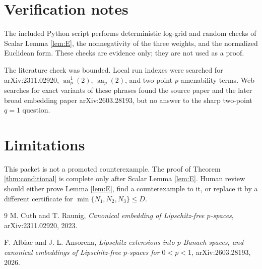 \documentclass[11pt]{article}
\newcommand{\absamen}{\operatorname{aa}}
\begin{document}
\section{Verification notes}

The included Python script performs deterministic log-grid and random checks of
Scalar Lemma \ref{lem:E}, the nonnegativity of the three weights, and the
normalized Euclidean form.  These checks are evidence only; they are not used
as a proof.

The literature check was bounded.  Local run indexes were searched for
arXiv:2311.02920, \(\absamen_p^1(2)\), \(\absamen_p(2)\), and two-point
\(p\)-amenability terms.  Web searches for exact variants of these phrases
found the source paper and the later broad embedding paper arXiv:2603.28193,
but no answer to the sharp two-point \(q=1\) question.

\section{Limitations}

This packet is not a promoted counterexample.  The proof of Theorem
\ref{thm:conditional} is complete only after Scalar Lemma \ref{lem:E}.  Human
review should either prove Lemma \ref{lem:E}, find a counterexample to it, or
replace it by a different certificate for
\(\min\{N_1,N_2,N_3\}\le D\).

\begin{thebibliography}{9}
M. Cuth and T. Raunig,
\emph{Canonical embedding of Lipschitz-free \(p\)-spaces},
arXiv:2311.02920, 2023.

F. Albiac and J. L. Ansorena,
\emph{Lipschitz extensions into \(p\)-Banach spaces, and canonical embeddings
of Lipschitz-free \(p\)-spaces for \(0<p<1\)},
arXiv:2603.28193, 2026.
\end{thebibliography}
\end{document}
